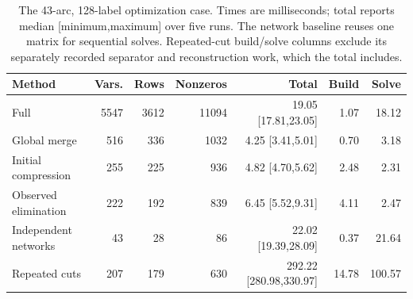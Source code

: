 \begin{table}[tb]\centering\footnotesize
\caption{The 43-arc, 128-label optimization case. Times are milliseconds; total reports median [minimum,maximum] over five runs. The network baseline reuses one matrix for sequential solves. Repeated-cut build/solve columns exclude its separately recorded separator and reconstruction work, which the total includes.}
\label{tab:computation-opt}
\setlength{\tabcolsep}{3pt}
\begin{tabular}{lrrr rrr}\toprule
Method & Vars. & Rows & Nonzeros & Total & Build & Solve\\\midrule
Full & 5547 & 3612 & 11094 & 19.05 [17.81,23.05] & 1.07 & 18.12 \\
Global merge & 516 & 336 & 1032 & 4.25 [3.41,5.01] & 0.70 & 3.18 \\
Initial compression & 255 & 225 & 936 & 4.82 [4.70,5.62] & 2.48 & 2.31 \\
Observed elimination & 222 & 192 & 839 & 6.45 [5.52,9.31] & 4.11 & 2.47 \\
Independent networks & 43 & 28 & 86 & 22.02 [19.39,28.09] & 0.37 & 21.64 \\
Repeated cuts & 207 & 179 & 630 & 292.22 [280.98,330.97] & 14.78 & 100.57 \\
\bottomrule\end{tabular}\end{table}
